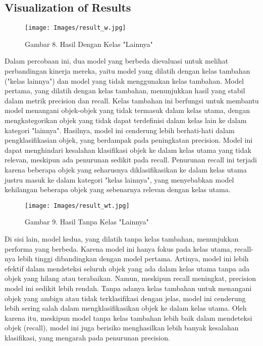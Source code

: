 \documentclass[12pt,a4paper]{article}
\begin{document}
\subsection{Visualization of Results}
\begin{adjustwidth}{3em}{0pt}
\begin{figure}[h]
    \centering
    \texttt{[image: Images/result\_w.jpg]}
    \caption*{Gambar 8. Hasil Dengan Kelas "Lainnya"}
    \label{fig:enter-label}
\end{figure}
\hspace{0.5cm} Dalam percobaan ini, dua model yang berbeda dievaluasi untuk melihat perbandingan kinerja mereka, yaitu model yang dilatih dengan kelas tambahan ("kelas lainnya") dan model yang tidak menggunakan kelas tambahan. Model pertama, yang dilatih dengan kelas tambahan, menunjukkan hasil yang stabil dalam metrik precision dan recall. Kelas tambahan ini berfungsi untuk membantu model menangani objek-objek yang tidak termasuk dalam kelas utama, dengan mengkategorikan objek yang tidak dapat terdefinisi dalam kelas lain ke dalam kategori "lainnya". Hasilnya, model ini cenderung lebih berhati-hati dalam pengklasifikasian objek, yang berdampak pada peningkatan precision. Model ini dapat menghindari kesalahan klasifikasi objek ke dalam kelas utama yang tidak relevan, meskipun ada penurunan sedikit pada recall. Penurunan recall ini terjadi karena beberapa objek yang seharusnya diklasifikasikan ke dalam kelas utama justru masuk ke dalam kategori "kelas lainnya", yang menyebabkan model kehilangan beberapa objek yang sebenarnya relevan dengan kelas utama.

\begin{adjustwidth}{3em}{0pt}
\begin{figure}[h]
    \centering
    \texttt{[image: Images/result\_wt.jpg]}
    \caption*{Gambar 9. Hasil Tanpa Kelas "Lainnya"}
    \label{fig:enter-label}
\end{figure}
\hspace{0.5cm} 
\end{adjustwidth}

\hspace{0.5cm} Di sisi lain, model kedua, yang dilatih tanpa kelas tambahan, menunjukkan performa yang berbeda. Karena model ini hanya fokus pada kelas utama, recall-nya lebih tinggi dibandingkan dengan model pertama. Artinya, model ini lebih efektif dalam mendeteksi seluruh objek yang ada dalam kelas utama tanpa ada objek yang hilang atau terabaikan. Namun, meskipun recall meningkat, precision model ini sedikit lebih rendah. Tanpa adanya kelas tambahan untuk menangani objek yang ambigu atau tidak terklasifikasi dengan jelas, model ini cenderung lebih sering salah dalam mengklasifikasikan objek ke dalam kelas utama. Oleh karena itu, meskipun model tanpa kelas tambahan lebih baik dalam mendeteksi objek (recall), model ini juga berisiko menghasilkan lebih banyak kesalahan klasifikasi, yang mengarah pada penurunan precision.


\end{adjustwidth}
\end{document}

